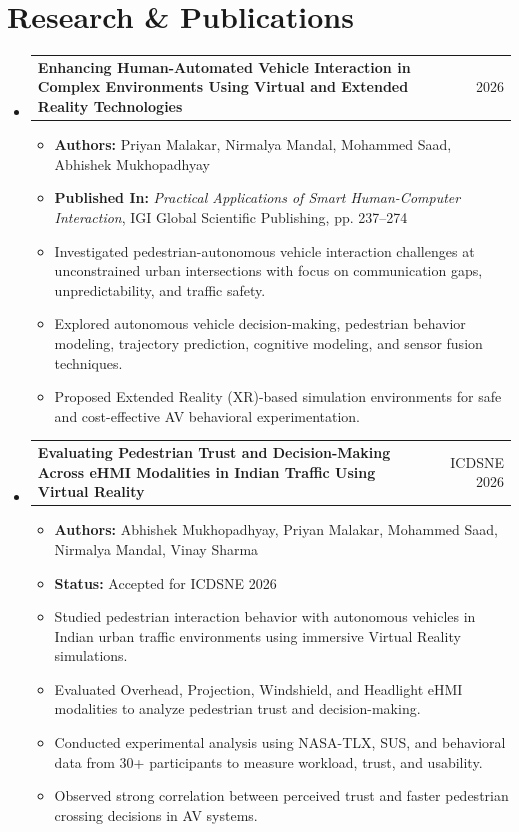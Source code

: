 \documentclass[letterpaper,10pt]{article}
\newcommand{\resumeItem}[1]{
    \item\small{#1 \vspace{-2pt}}
}
\newcommand{\resumeProjectHeading}[2]{
    \item
    \begin{tabularx}{0.97\textwidth}{Xr}
        \small\textbf{#1} & \small #2 \\
    \end{tabularx}\vspace{-7pt}
}
\newcommand{\resumeSubHeadingListStart}{\begin{itemize}[leftmargin=0.15in, label={}]}
\newcommand{\resumeSubHeadingListEnd}{\end{itemize}}
\newcommand{\resumeItemListStart}{\begin{itemize}[leftmargin=0.2in]}
\newcommand{\resumeItemListEnd}{\end{itemize}\vspace{-5pt}}
\begin{document}
\section{Research \& Publications}

\resumeSubHeadingListStart

\resumeProjectHeading
{Enhancing Human-Automated Vehicle Interaction in Complex Environments Using Virtual and Extended Reality Technologies}{2026}

\resumeItemListStart
    \resumeItem{\textbf{Authors:} Priyan Malakar, Nirmalya Mandal, Mohammed Saad, Abhishek Mukhopadhyay}
    \resumeItem{\textbf{Published In:} \emph{Practical Applications of Smart Human-Computer Interaction}, IGI Global Scientific Publishing, pp. 237--274}
    \resumeItem{Investigated pedestrian-autonomous vehicle interaction challenges at unconstrained urban intersections with focus on communication gaps, unpredictability, and traffic safety.}
    \resumeItem{Explored autonomous vehicle decision-making, pedestrian behavior modeling, trajectory prediction, cognitive modeling, and sensor fusion techniques.}
    \resumeItem{Proposed Extended Reality (XR)-based simulation environments for safe and cost-effective AV behavioral experimentation.}
\resumeItemListEnd

\vspace{4pt}

\resumeProjectHeading
{Evaluating Pedestrian Trust and Decision-Making Across eHMI Modalities in Indian Traffic Using Virtual Reality}{ICDSNE 2026}

\resumeItemListStart
    \resumeItem{\textbf{Authors:} Abhishek Mukhopadhyay, Priyan Malakar, Mohammed Saad, Nirmalya Mandal, Vinay Sharma}
    \resumeItem{\textbf{Status:} Accepted for ICDSNE 2026}
    \resumeItem{Studied pedestrian interaction behavior with autonomous vehicles in Indian urban traffic environments using immersive Virtual Reality simulations.}
    \resumeItem{Evaluated Overhead, Projection, Windshield, and Headlight eHMI modalities to analyze pedestrian trust and decision-making.}
    \resumeItem{Conducted experimental analysis using NASA-TLX, SUS, and behavioral data from 30+ participants to measure workload, trust, and usability.}
    \resumeItem{Observed strong correlation between perceived trust and faster pedestrian crossing decisions in AV systems.}
\resumeItemListEnd

\resumeSubHeadingListEnd

\vspace{-2pt}
\end{document}
